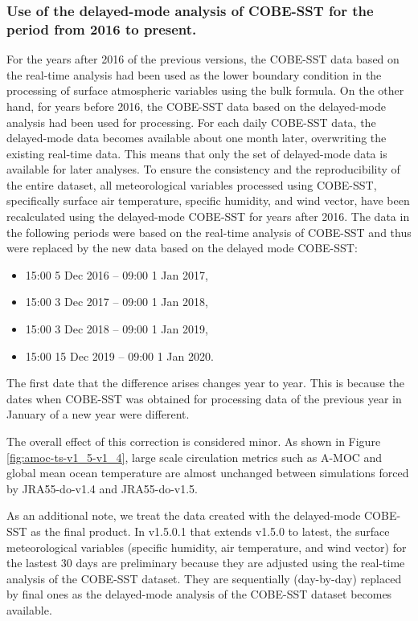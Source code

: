 \documentclass[dvipdfmx]{elsarticle_mod}
\begin{document}
\subsubsection{Use of the delayed-mode analysis of COBE-SST for the period from 2016 to present.}
\label{app:version_1_5v2}

For the years after 2016 of the previous versions, the COBE-SST data based on the real-time analysis had been used as the lower boundary condition in the processing of surface atmospheric variables using the bulk formula. On the other hand, for years before 2016, the COBE-SST data based on the delayed-mode analysis had been used for processing. For each daily COBE-SST data, the delayed-mode data becomes available about one month later, overwriting the existing real-time data. This means that only the set of delayed-mode data is available for later analyses. To ensure the consistency and the reproducibility of the entire dataset, all meteorological variables processed using COBE-SST, specifically surface air temperature, specific humidity, and wind vector, have been recalculated using the delayed-mode COBE-SST for years after 2016. The data in the following periods were based on the real-time analysis of COBE-SST and thus were replaced by the new data based on the delayed mode COBE-SST:
\begin{itemize}
 \item 15:00 5 Dec 2016 -- 09:00 1 Jan 2017,
 \item 15:00 3 Dec 2017 -- 09:00 1 Jan 2018,
 \item 15:00 3 Dec 2018 -- 09:00 1 Jan 2019,
 \item 15:00 15 Dec 2019 -- 09:00 1 Jan 2020.
\end{itemize}
The first date that the difference arises changes year to year. This is because the dates when COBE-SST was obtained for processing data of the previous year in January of a new year were different.

The overall effect of this correction is considered minor. As shown in Figure \ref{fig:amoc-ts-v1_5-v1_4}, large scale circulation metrics such as A-MOC and global mean ocean temperature are almost unchanged between simulations forced by JRA55-do-v1.4 and JRA55-do-v1.5.

As an additional note, we treat the data created with the delayed-mode COBE-SST as the final product. In v1.5.0.1 that extends v1.5.0 to latest, the surface meteorological variables (specific humidity, air temperature, and wind vector) for the lastest 30 days are preliminary because they are adjusted using the real-time analysis of the COBE-SST dataset. They are sequentially (day-by-day) replaced by final ones as the delayed-mode analysis of the COBE-SST dataset becomes available.
\end{document}
